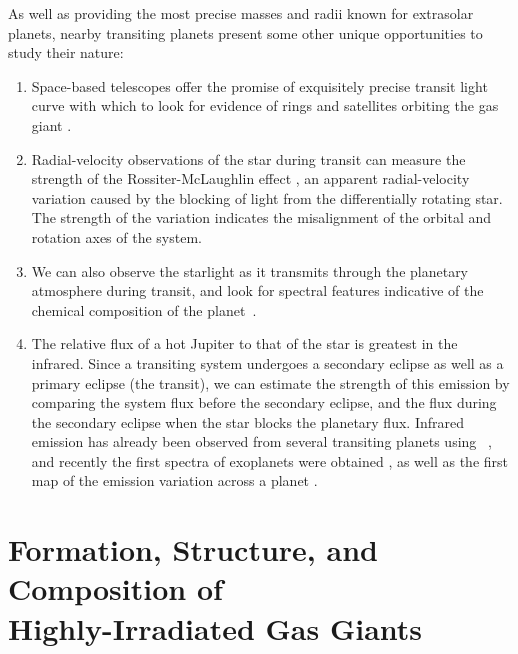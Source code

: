 As well as providing the most precise masses and radii known for extrasolar planets, nearby transiting planets present some other unique opportunities to study their nature:
\begin{enumerate}
\item
Space-based telescopes offer the promise of exquisitely precise transit light curve with which to look for evidence of rings and satellites orbiting the gas giant \citep[see, e.g.,][]{Brown_Charbonneau_Gilliland:apj:2001a}. 
\item 
Radial-velocity observations of the star during transit can measure the strength of the Rossiter-McLaughlin effect \citep{McLaughlin:apj:1924a,Rossiter:apj:1924a}, an apparent radial-velocity variation caused by the blocking of light from the differentially rotating star. 
The strength of the variation indicates the misalignment of the orbital and rotation axes of the system.
\item 
We can also observe the starlight as it transmits through the planetary atmosphere during transit, and look for spectral features indicative of the chemical composition of the planet~\citep{Charbonneau_Brown_Noyes:apj:2002a, Vidal-Madjar_Lecavelier-des-Etangs_Desert:nat:2003a, Vidal-Madjar_Desert_Lecavelier-des-Etangs:apjl:2004a, Deming_Brown_Charbonneau:apj:2005a, Barman:apjl:2007a}.
\item
The relative flux of a hot Jupiter to that of the star is greatest in the infrared.
Since a transiting system undergoes a secondary eclipse as well as a primary eclipse (the transit), we can estimate the strength of this emission by comparing the system flux before the secondary eclipse, and the flux during the secondary eclipse when the star blocks the planetary flux. 
Infrared emission has already been observed from several transiting planets using \spi\ \citep[see, e.g.,][]{Charbonneau_Allen_Megeath:apj:2005a, Deming_Seager_Richardson:nat:2005a}, and recently the first spectra of exoplanets were obtained \citep{Richardson_Deming_Horning:Nature:2007a, Swain_Bouwman_Akeson:preprint:2007a, Grillmair_Charbonneau_Burrows:apjl:2007a}, as well as the first map of the emission variation across a planet \citep{Knutson_Charbonneau_Allen:nat:2007a}.
\end{enumerate}

\section[Formation, Structure, and Composition of Highly-Irradiated Gas Giants]
{Formation, Structure, and Composition of \\ Highly-Irradiated Gas Giants}
\label{cha:intro:sec:form}

